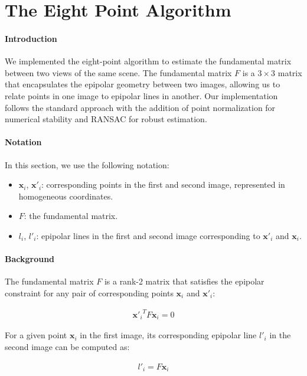 \section{The Eight Point Algorithm}

\paragraph{Introduction} We implemented the eight-point algorithm to estimate the fundamental matrix between two views of the same scene. The fundamental matrix $F$ is a $3 \times 3$ matrix that encapsulates the epipolar geometry between two images, allowing us to relate points in one image to epipolar lines in another. Our implementation follows the standard approach with the addition of point normalization for numerical stability and RANSAC for robust estimation.

\paragraph{Notation} In this section, we use the following notation:

\begin{itemize}
    \item $\mathbf{x}_i$, $\mathbf{x}'_i$: corresponding points in the first and second image, represented in homogeneous coordinates.
    \item $F$: the fundamental matrix.
    \item $l_i$, $l'_i$: epipolar lines in the first and second image corresponding to $\mathbf{x}'_i$ and $\mathbf{x}_i$.
\end{itemize}

\paragraph{Background} The fundamental matrix $F$ is a rank-2 matrix that satisfies the epipolar constraint for any pair of corresponding points $\mathbf{x}_i$ and $\mathbf{x}'_i$:

\begin{align*}
    {\mathbf{x}'_i}^T F \mathbf{x}_i = 0
\end{align*}

For a given point $\mathbf{x}_i$ in the first image, its corresponding epipolar line $l'_i$ in the second image can be computed as:

\begin{align*}
l'_i = F \mathbf{x}_i
\end{align*}

